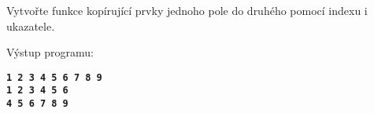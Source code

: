 \begin{mdframed}[style=mdexam]
  \begin{example}Vytvořte funkce kopírující prvky jednoho pole do druhého pomocí indexu i 
    ukazatele.      
    
    Výstup programu:%
    \begin{mdframed}[style=mdmsdos]
      \texttt{\textbf{1   2   3   4   5   6   7   8   9}} \\
      \texttt{\textbf{1   2   3   4   5   6}} \\
      \texttt{\textbf{4   5   6   7   8   9}}
    \end{mdframed}
  \end{example}
\end{mdframed}